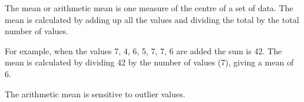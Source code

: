 The mean or arithmetic mean is one measure of the centre of a set of data. The mean is calculated by adding up all the values and dividing the total by the total number of values.

\par
For example, when the values 7, 4, 6, 5, 7, 7, 6 are added the sum is 42. The mean is calculated by dividing 42 by the number of values (7), giving a mean of 6.

\par
The arithmetic mean is sensitive to outlier values.
